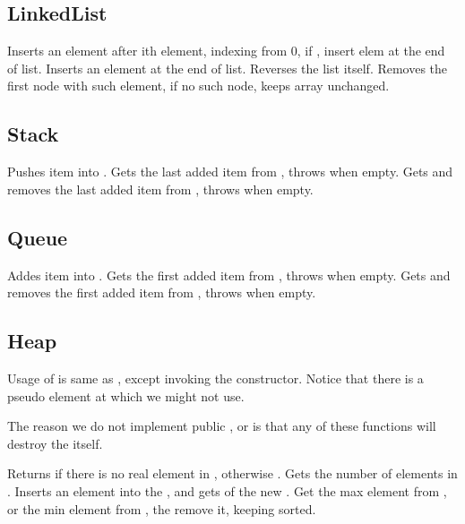 \subsection{LinkedList}
Inserts an element after ith element, indexing from 0, if , insert elem at the end of list.
Inserts an element at the end of list.
Reverses the list itself.
Removes the first node with such element, if no such node, keeps array unchanged.

\subsection{Stack}
Pushes  item into .
Gets the last added item from , throws  when empty.
Gets and removes the last added item from , throws  when empty.

\subsection{Queue}
Addes item into .
Gets the first added item from , throws  when empty.
Gets and removes the first added item from , throws  when empty.

\subsection{Heap}
Usage of  is same as , except invoking the constructor.
Notice that there is a pseudo element at  which we might not use.

The reason we do not implement public ,  or  is
that any of these functions will destroy the  itself.

Returns  if there is no real element in , otherwise .
Gets the number of elements in .
Inserts an element into the , and gets  of the new .
Get the max element from , or the min element from , 
the remove it, keeping  sorted.

